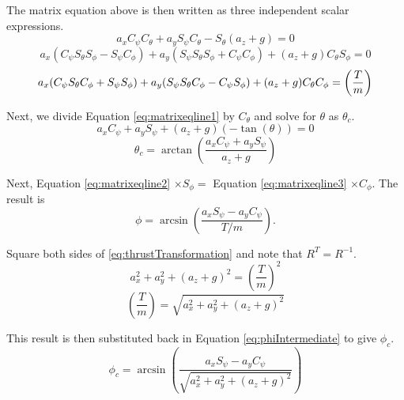 The matrix equation above is then written as three independent scalar expressions.
\begin{equation}
    \label{eq:matrixeqline1}
    a_x C_{\psi} C_{\theta} + a_y S_{\psi} C_{\theta} - S_{\theta}( a_z + g ) = 0
\end{equation}
\begin{equation}
    \label{eq:matrixeqline2}
     a_x (C_{\psi} S_{\theta} S_{\phi} - S_{\psi} C_{\phi})
    + a_y (S_{\psi} S_{\theta} S_{\phi} + C_{\psi} C_{\phi})
    + ( a_z + g )C_{\theta} S_{\phi} = 0
\end{equation}
\begin{equation}
    \label{eq:matrixeqline3}
    a_x (C_{\psi} S_{\theta} C_{\phi} + S_{\psi}  S_{\phi})\\
    + a_y (S_{\psi} S_{\theta} C_{\phi} - C_{\psi}  S_{\phi})\\
    + ( a_z + g ) C_{\theta} C_{\phi} = \left(\frac{T}{m}\right)
\end{equation}

Next, we divide Equation \eqref{eq:matrixeqline1} by $C_{\theta}$ and solve for $\theta$ as $\theta_c$.
\begin{equation}
a_x C_{\psi} + a_y S_{\psi} + (a_z+g)(-\tan(\theta)) = 0
\end{equation}
\begin{equation}
    \label{eq:thetac}
    \theta_c = \arctan \left( \frac{a_x C_{\psi} + a_y S_{\psi}}{a_z+g} \right)
\end{equation}

Next,  Equation \eqref{eq:matrixeqline2} $\times  S_{\phi}  =$ Equation \eqref{eq:matrixeqline3} $\times C_{\phi} $. The result is
\begin{equation}
    \label{eq:phiIntermediate}
    \phi = \arcsin \left( \frac{a_x S_{\psi} - a_y C_{\psi}}{T/m} \right).
\end{equation}

Square both sides of \eqref{eq:thrustTransformation} and note that $ R^T = R^{-1}$.
\begin{equation}
a_x^2 + a_y^2 + (a_z + g)^2 = \left(\frac{T}{m}\right)^2
\end{equation}
\begin{equation}
\left(\frac{T}{m}\right) = \sqrt{a_x^2 + a_y^2 + (a_z + g)^2}
\end{equation}

This result is then substituted back in Equation \eqref{eq:phiIntermediate} to give $\phi_c$.
\begin{equation}
    \label{eq:phic}
    \phi_c = \arcsin\left( \frac{a_x S_{\psi} - a_y C_{\psi}}{\sqrt{a_x^2 + a_y^2 + (a_z + g)^2}} \right)
\end{equation}

